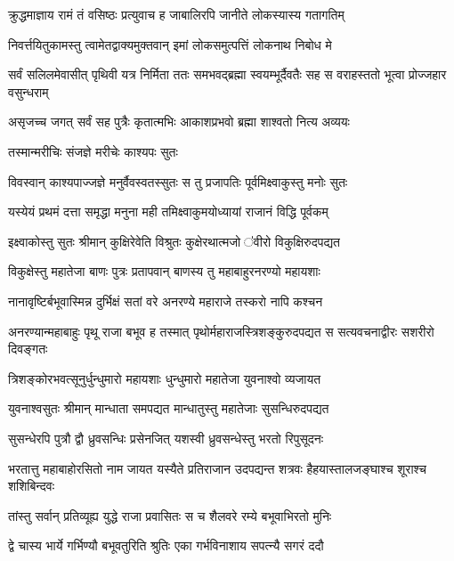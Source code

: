 
\twolineshloka
{क्रुद्धमाज्ञाय रामं तं वसिष्ठः प्रत्युवाच ह}
{जाबालिरपि जानीते लोकस्यास्य गतागतिम्} %

\twolineshloka
{निवर्त्तयितुकामस्तु त्वामेतद्वाक्यमुक्तवान्}
{इमां लोकसमुत्पत्तिं लोकनाथ निबोध मे} %

\threelineshloka
{सर्वं सलिलमेवासीत् पृथिवी यत्र निर्मिता}
{ततः समभवद्ब्रह्मा स्वयम्भूर्दैवतैः सह}
{स वराहस्ततो भूत्वा प्रोज्जहार वसुन्धराम्} %

\twolineshloka
{असृजच्च जगत् सर्वं सह पुत्रैः कृतात्मभिः}
{आकाशप्रभवो ब्रह्मा शाश्वतो नित्य अव्ययः} %

\onelineshloka
{तस्मान्मरीचिः संजज्ञे मरीचेः काश्यपः सुतः} %

\twolineshloka
{विवस्वान् काश्यपाज्जज्ञे मनुर्वैवस्वतस्सुतः}
{स तु प्रजापतिः पूर्वमिक्ष्वाकुस्तु मनोः सुतः} %

\twolineshloka
{यस्येयं प्रथमं दत्ता समृद्धा मनुना मही}
{तमिक्ष्वाकुमयोध्यायां राजानं विद्धि पूर्वकम्} %

\twolineshloka
{इक्ष्वाकोस्तु सुतः श्रीमान् कुक्षिरेवेति विश्रुतः}
{कुक्षेरथात्मजो ऺवीरो विकुक्षिरुदपद्यत} %

\twolineshloka
{विकुक्षेस्तु महातेजा बाणः पुत्रः प्रतापवान्}
{बाणस्य तु महाबाहुरनरण्यो महायशाः} %

\twolineshloka
{नानावृष्टिर्बभूवास्मिन्न दुर्भिक्षं सतां वरे}
{अनरण्ये महाराजे तस्करो नापि कश्चन} %

\threelineshloka
{अनरण्यान्महाबाहुः पृथू राजा बभूव ह}
{तस्मात् पृथोर्महाराजस्त्रिशङ्कुरुदपद्यत}
{स सत्यवचनाद्वीरः सशरीरो दिवङ्गतः} %

\twolineshloka
{त्रिशङ्कोरभवत्सूनुर्धुन्धुमारो महायशाः}
{धुन्धुमारो महातेजा युवनाश्वो व्यजायत} %

\twolineshloka
{युवनाश्वसुतः श्रीमान् मान्धाता समपद्यत}
{मान्धातुस्तु महातेजाः सुसन्धिरुदपद्यत} %

\twolineshloka
{सुसन्धेरपि पुत्रौ द्वौ ध्रुवसन्धिः प्रसेनजित्}
{यशस्वी ध्रुवसन्धेस्तु भरतो रिपुसूदनः} %

\threelineshloka
{भरतात्तु महाबाहोरसितो नाम जायत}
{यस्यैते प्रतिराजान उदपद्यन्त शत्रवः}
{हैहयास्तालजङ्घाश्च शूराश्च शशिबिन्दवः} %

\twolineshloka
{तांस्तु सर्वान् प्रतिव्यूह्य युद्धे राजा प्रवासितः}
{स च शैलवरे रम्ये बभूवाभिरतो मुनिः} %

\twolineshloka
{द्वे चास्य भार्ये गर्भिण्यौ बभूवतुरिति श्रुतिः}
{एका गर्भविनाशाय सपत्न्यै सगरं ददौ} %

